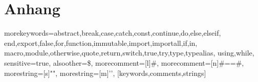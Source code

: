 \chapter{Anhang}
%
  {morekeywords={abstract,break,case,catch,const,continue,do,else,elseif,%
      end,export,false,for,function,immutable,import,importall,if,in,%
      macro,module,otherwise,quote,return,switch,true,try,type,typealias,%
      using,while},%
   sensitive=true,%
   alsoother={\$},%
   morecomment=[l]#,%
   morecomment=[n]{#=}{=#},%
   morestring=[s]{"}{"},%
   morestring=[m]{'}{'},%
}[keywords,comments,strings]%

